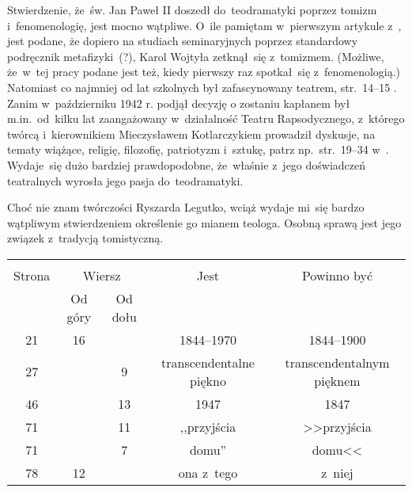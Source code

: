 \documentclass[a4paper,11pt]{article}
\begin{document}



\start {} Stwierdzenie, że~św. Jan Paweł II doszedł
do~teodramatyki poprzez tomizm i~fenomenologię, jest mocno wątpliwe.
O~ile pamiętam w~pierwszym artykule z~\cite{PoslugaMysleniaTomIX2011},
jest podane, że dopiero na studiach seminaryjnych poprzez standardowy
podręcznik metafizyki~(?), Karol Wojtyła zetknął~się z~tomizmem.
(Możliwe, że~w~tej pracy podane jest też, kiedy pierwszy raz
spotkał~się z~fenomenologią.) Natomiast co najmniej od lat szkolnych
był zafascynowany teatrem, str.~14--15
\cite{NowakJanPawelIIKronikaZyciaIPontyfikatu2015}. Zanim
w~październiku 1942 r. podjął decyzję o zostaniu kapłanem był
m.in.~od~kilku lat zaangażowany w~działalność Teatru Rapsodycznego,
z~którego twórcą i~kierownikiem Mieczysławem Kotlarczykiem prowadził
dyskusje, na tematy wiążące, religię, filozofię, patriotyzm i~sztukę,
patrz np.~str.~19--34
w~\cite{NowakJanPawelIIKronikaZyciaIPontyfikatu2015}. Wydaje~się dużo
bardziej prawdopodobne, że~właśnie z~jego doświadczeń teatralnych
wyrosła jego pasja do~teodramatyki.

\vspace{\spaceFour}


\start {} Choć nie znam twórczości Ryszarda Legutko, wciąż
wydaje mi~się bardzo wątpliwym stwierdzeniem określenie go mianem
teologa. Osobną sprawą jest jego związek z~tradycją tomistyczną.

\begin{center}
  \begin{tabular}{|c|c|c|c|c|}
    \hline
    & \multicolumn{2}{c|}{} & & \\
    Strona & \multicolumn{2}{c|}{Wiersz} & Jest
                              & Powinno być \\ \cline{2-3}
    & Od góry & Od dołu & & \\
    \hline
    21  & 16 & & 1844--1970 & 1844--1900 \\
    27  & &  9 & transcendentalne piękno & transcendentalnym pięknem \\
    46  & & 13 & 1947 & 1847 \\
    71  & & 11 & ,,przyjścia  %
           & >>przyjścia \\
    71  & &  7 & domu'' & domu<< \\
    78  & 12 & & ona z~tego & z~niej \\
    \hline
  \end{tabular}
\end{center}
\end{document}
